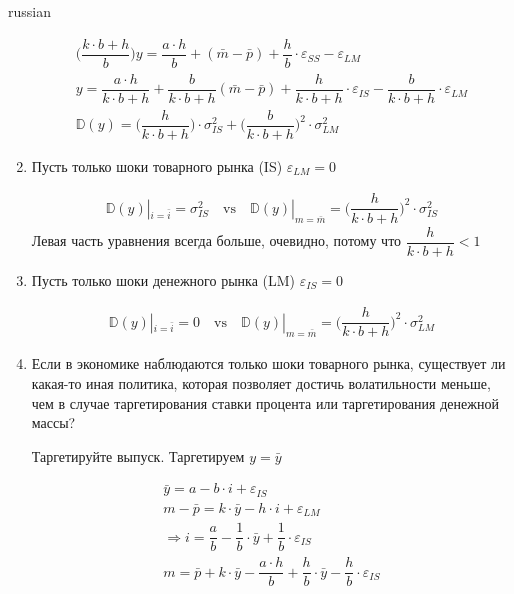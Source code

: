 \documentclass{article}
\begin{document}
\begin{otherlanguage*}{russian}
\begin{enumerate}
\begin{align*}
\Big( \dfrac{k \cdot b + h}{b}\Big) y = \dfrac{a \cdot h }{b} + ( \bar{m} - \bar{p} ) + \dfrac{h}{b} \cdot \varepsilon_{SS} - \varepsilon_{LM} \\
y = \dfrac{a \cdot h }{k \cdot b + h} + \dfrac{b}{k \cdot b + h} (\bar{m} - \bar{p} ) + \dfrac{h}{k \cdot b + h }  \cdot \varepsilon_{IS} - \dfrac{b}{k \cdot b + h} \cdot \varepsilon_{LM} \\
\mathbb{D} (y) = \Big( \dfrac{h}{k \cdot b + h }\Big) \cdot \sigma^2_{IS} + \Big(\dfrac{b}{k \cdot b + h} \Big)^2 \cdot \sigma^2_{LM} 
\end{align*}
\item Пусть только шоки товарного рынка (IS) $ \varepsilon_{LM} = 0 $ 

\begin{align*}
\mathbb{D} (y)|_{i= \bar{i}} = \sigma^2_{IS} \quad \text{vs} \quad  \mathbb{D} (y)|_{m = \bar{m} } = \Big(\dfrac{h}{k \cdot b + h} \Big)^2 \cdot \sigma^2_{IS} 
\end{align*}
Левая часть уравнения всегда больше, очевидно, потому что $ \dfrac{h}{k \cdot b + h} < 1 $ 

\item Пусть только шоки денежного рынка (LM) $ \varepsilon_{IS} = 0 $ 

\begin{align*}
\mathbb{D} (y)|_{i= \bar{i}} = 0 \quad \text{vs} \quad  \mathbb{D} (y)|_{m = \bar{m} } = \Big(\dfrac{h}{k \cdot b + h} \Big)^2 \cdot \sigma^2_{LM} 
\end{align*}

\item Если в экономике наблюдаются только шоки товарного рынка, существует ли какая-то иная политика, которая позволяет достичь волатильности меньше, чем в случае таргетирования ставки процента или таргетирования денежной массы?

Таргетируйте выпуск. Таргетируем $ y = \bar{y} $ 

\begin{align*}
\bar y = a - b \cdot i + \varepsilon_{IS} \\
m - \bar{p} = k \cdot \bar{y} - h \cdot i + \varepsilon_{LM} \\
\Rightarrow i = \dfrac{a}{b} - \dfrac{1}{b } \cdot \bar{y} + \dfrac{1}{b} \cdot \varepsilon_{IS} \\
m = \bar{p} + k \cdot \bar{y} - \dfrac{a \cdot h}{b} + \dfrac{h}{b} \cdot \bar{y} - \dfrac{h}{b} \cdot \varepsilon_{IS} 
\end{align*}
\end{enumerate}

\end{otherlanguage*}
\end{document}
